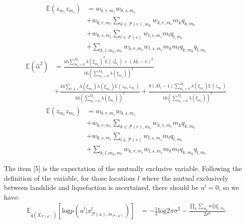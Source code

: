 \documentclass[review]{elsarticle}
\begin{document}
\begin{equation*}
\begin{aligned}
\mathbb{E}(z_{m_{r}}z_{m_{s}}) & = w_{0, r, m_{r}}w_{0, s, m_{s}}
    \\
    & + w_{0, r, m_{r}}\sum_{k \in \mathcal{P}(r), m_{k}}w_{k, r, m_{r}}m_{k}q_{k, m_{k}}\\
    & + w_{0, s, m_{s}} \sum_{l \in \mathcal{P}(s)}w_{l, s, m_{s}}m_{l}q_{l, m_{l}} \\ 
    & + \sum_{k, l,m_{k}, m_{l}}w_{k, r, m_{r}}w_{l, s, m_{s}}m_{k}m_{l}q_{k, m_{k}}q_{l, m_{l}}
\end{aligned}
\end{equation*}
\begin{equation*}
\begin{aligned}
    \mathbb{E}(\hat{\alpha}^{2}) & = \frac{16\sum_{m_{i} = 0}^{M_{i}}\lambda(\xi_{m_{i}})^{2}\mathbb{E}(z_{m_{i}}^{2})
    + (M_{i} - 1)^{2}}{16(\sum_{m_{i} = 0}^{M_{i}}\lambda(\xi_{m_{i}}))^{2}} \\
    & + \frac{16\sum_{r \neq s} \lambda(\xi_{m_{r}})\lambda(\xi_{m_{s}})\mathbb{E}(z_{m_{r}}z_{m_{s}})}{16(\sum_{m_{i} = 0}^{M_{i}}\lambda(\xi_{m_{i}}))^{2}} +  \frac{8(M_{i} - 1)\sum_{m_{i} = 0}^{M_{i}}\lambda(\xi_{m_{i}})\mathbb{E}(z_{m_{i}})}{16(\sum_{m_{i} = 0}^{M_{i}}\lambda(\xi_{m_{i}}))^{2}}
\end{aligned}
\end{equation*}
\begin{equation*}
\begin{aligned}
\mathbb{E}(z_{m_{r}}z_{m_{s}}) & = w_{0, r, m_{r}}w_{0, s, m_{s}}\\
    & + w_{0, r, m_{r}}\sum_{k \in \mathcal{P}(r), m_{k}}w_{k, r, m_{r}}m_{k}q_{k, m_{k}} \\
    & + w_{0, s, m_{s}} \sum_{l \in \mathcal{P}(s)}w_{l, s, m_{s}}m_{l}q_{l, m_{l}} \\ 
    & + \sum_{k, l,m_{k}, m_{l}}w_{k, r, m_{r}}w_{l, s, m_{s}}m_{k}m_{l}q_{k, m_{k}}q_{l, m_{l}}
\end{aligned}
\end{equation*}

The item [5] is the expectation of the mutually exclusive variable. Following the definition of the variable, for those locations $l$ where the mutual exclusively between landslide and liquefaction is ascertained, there should be $u^{l} = 0$, so we have:
\begin{equation*}
\begin{aligned}
    \mathbb{E}_{q(X_{\mathcal{P}(u^l)})}[\text{log}p(u^l|x^{l}_{\mathcal{P}(u),m_{\mathcal{P}(u^l)}})] & =  -\frac{1}{2}\text{log}2\pi \sigma^2 - \frac{\prod_{k}\sum_{m_{k}}m_{k}^2 q^l_{k,m_{k}}}{2\sigma^2}
\end{aligned}
\end{equation*}
\end{document}
